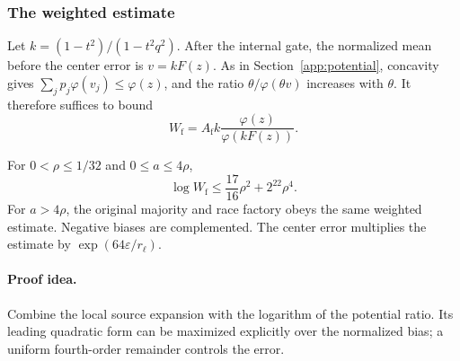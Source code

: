 \subsubsection{The weighted estimate}

Let \(k=(1-t^2)/(1-t^2q^2)\).  After the internal gate, the
normalized mean before the center error is \(v=kF(z)\).
As in Section~\ref{app:potential}, concavity gives
\(\sum_jp_j\varphi(v_j)\le\varphi(z)\), and the ratio
\(\theta/\varphi(\theta v)\) increases with \(\theta\).
It therefore suffices to bound
\[
 W_{\mathrm f}=A_{\mathrm f}k\frac{\varphi(z)}{\varphi(kF(z))}.
\]

\begin{lemma}\label{lem:fusedlocal}
For \(0<\rho\le1/32\) and \(0\le a\le4\rho\),
\begin{equation}\label{eq:fusedlocal}
 \log W_{\mathrm f}\le\frac{17}{16}\rho^2+2^{22}\rho^4.
\end{equation}
For \(a>4\rho\), the original majority and race factory obeys
the same weighted estimate.  Negative biases are complemented.
The center error multiplies the estimate by
\(\exp(64\varepsilon/r_\ell)\).
\end{lemma}
\paragraph{Proof idea.}
Combine the local source expansion with the logarithm of the potential
ratio. Its leading quadratic form can be maximized explicitly over the
normalized bias; a uniform fourth-order remainder controls the error.

